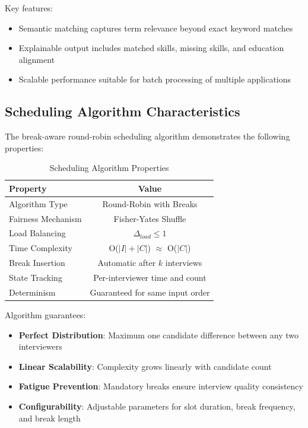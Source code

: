 \documentclass[conference]{IEEEtran}
\begin{document}
Key features:
\begin{itemize}
    \item Semantic matching captures term relevance beyond exact keyword matches
    \item Explainable output includes matched skills, missing skills, and education alignment
    \item Scalable performance suitable for batch processing of multiple applications
\end{itemize}

\subsection{Scheduling Algorithm Characteristics}

The break-aware round-robin scheduling algorithm demonstrates the following properties:

\begin{table}[htbp]
\caption{Scheduling Algorithm Properties}
\label{tab:scheduling_performance}
\begin{center}
\begin{tabular}{|l|c|}
\hline
\textbf{Property} & \textbf{Value} \\
\hline
Algorithm Type & Round-Robin with Breaks \\
Fairness Mechanism & Fisher-Yates Shuffle \\
Load Balancing & $\Delta_{load} \leq 1$ \\
Time Complexity & O($|I| + |C|$) $\approx$ O($|C|$) \\
Break Insertion & Automatic after $k$ interviews \\
State Tracking & Per-interviewer time and count \\
Determinism & Guaranteed for same input order \\
\hline
\end{tabular}
\end{center}
\end{table}

Algorithm guarantees:
\begin{itemize}
    \item \textbf{Perfect Distribution}: Maximum one candidate difference between any two interviewers
    \item \textbf{Linear Scalability}: Complexity grows linearly with candidate count
    \item \textbf{Fatigue Prevention}: Mandatory breaks ensure interview quality consistency
    \item \textbf{Configurability}: Adjustable parameters for slot duration, break frequency, and break length
\end{itemize}
\end{document}
